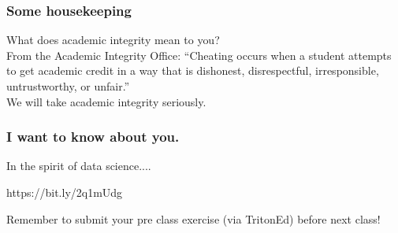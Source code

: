 \documentclass[11pt]{beamer}
\begin{document}
\begin{frame}
\frametitle{Some housekeeping}
What does \alert{academic integrity} mean to you?\\
\pause
\bigskip
From the Academic Integrity Office: ``Cheating occurs when a student attempts to get academic credit in a way that is dishonest, disrespectful, irresponsible, untrustworthy, or unfair.''\\
\pause
\bigskip
We will take academic integrity seriously. 
\end{frame}

\begin{frame}
\frametitle{I want to know about you.}

In the spirit of data science....
\bigskip
\begin{center}
https://bit.ly/2q1mUdg %
\end{center}
\bigskip
\bigskip
Remember to submit your pre class exercise (via TritonEd) before next class!

\end{frame}
\end{document}

